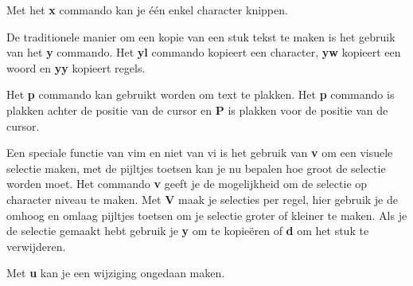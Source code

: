 Met het \textbf{x} commando kan je \'e\'en enkel character knippen.

De traditionele manier om een kopie van een stuk tekst te maken is het gebruik van het \textbf{y} commando. Het \textbf{yl} commando kopieert een character, \textbf{yw} kopieert een woord en \textbf{yy} kopieert regels.

Het \textbf{p} commando kan gebruikt worden om text te plakken. Het \textbf{p} commando is plakken achter de positie van de cursor en \textbf{P} is plakken voor de positie van de cursor.

Een speciale functie van vim en niet van vi is het gebruik van \textbf{v} om een visuele selectie maken, met de pijltjes toetsen kan je nu bepalen hoe groot de selectie worden moet. Het commando \textbf{v} geeft je de mogelijkheid om de selectie op character niveau te maken. Met \textbf{V} maak je selecties per regel, hier gebruik je de omhoog en omlaag pijltjes toetsen om je selectie groter of kleiner te maken. Als je de selectie gemaakt hebt gebruik je \textbf{y} om te kopie\"eren of \textbf{d} om het stuk te verwijderen.

Met \textbf{u} kan je een wijziging ongedaan maken.

